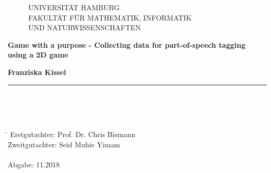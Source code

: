 \begin{titlepage}

  \setcounter{page}{-1}

	\begin{figure}[h]
		UNIVERSITÄT HAMBURG\\
FAKULTÄT FÜR MATHEMATIK, INFORMATIK \\
UND NATURWISSENSCHAFTEN

		\vspace{1cm}
	\end{figure}

	\vfill
	
	\begin{center}
		\vspace{14mm}
		\noindent \textbf{\huge
		  Game with a purpose - Collecting data for part-of-speech tagging using a 2D game \\
		}
		\vspace{60mm}	
	\end{center}
	
	\vfill
	
	\noindent \textbf{Franziska Kissel} \\
	\noindent \rule{\textwidth}{0.4mm} 
	 \\
	 \\
	 \\
	\begin{tabbing}
	\hspace{8em} \=  \kill
	Erstgutachter: \> Prof. Dr. Chris Biemann \\
	Zweitgutachter: \> Seid Muhie Yimam \\
	~ \\
	Abgabe: 11.2018
	\end{tabbing}
	
	\newpage 
	\thispagestyle{empty}
	\setcounter{page}{0}

\end{titlepage}


